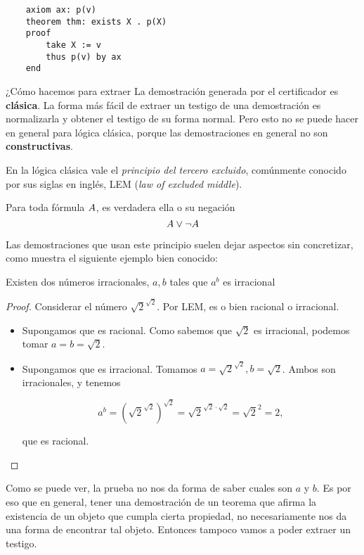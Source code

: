 \begin{verbatim}
    axiom ax: p(v)
    theorem thm: exists X . p(X)
    proof
        take X := v
        thus p(v) by ax
    end
\end{verbatim}

¿Cómo hacemos para extraer La demostración generada por el certificador es \textbf{clásica}. La forma más
fácil de extraer un testigo de una demostración es normalizarla y obtener el
testigo de su forma normal. Pero esto no se puede hacer en general para lógica
clásica, porque las demostraciones en general no son \textbf{constructivas}.

En la lógica clásica vale el \textit{principio del tercero excluido}, comúnmente
conocido por sus siglas en inglés, LEM (\textit{law of excluded middle}).

\begin{prop}[LEM] Para toda fórmula $A$, es verdadera ella o su negación
    \[ A \vee \neg A \]
\end{prop}

Las demostraciones que usan este principio suelen dejar aspectos sin
concretizar, como muestra el siguiente ejemplo bien conocido:

\begin{theorem}\label{thm:irrat}
    Existen dos números irracionales, $a, b$ tales que $a^b$ es irracional
\end{theorem}
\begin{proof}
    Considerar el número $\sqrt{2}^{\sqrt{2}}$. Por LEM, es o bien racional o
    irracional.
    \begin{itemize}
        \item Supongamos que es racional. Como sabemos que $\sqrt{2}$ es
        irracional, podemos tomar $a=b=\sqrt{2}$.
        \item Supongamos que es irracional. Tomamos $a = \sqrt{2}^{\sqrt{2}}, b
        = \sqrt{2}$. Ambos son irracionales, y tenemos

        \[
            a^b
            = \left( \sqrt{2}^{\sqrt{2}} \right)^{\sqrt{2}}
            = \sqrt{2}^{\sqrt{2} \cdot \sqrt{2}}
            = \sqrt{2}^{2}
            = 2,
        \]

        que es racional.
    \end{itemize}
\end{proof}

Como se puede ver, la prueba no nos da forma de saber cuales son $a$ y $b$. Es
por eso que en general, tener una demostración de un teorema que afirma la
existencia de un objeto que cumpla cierta propiedad, no necesariamente nos da
una forma de encontrar tal objeto. Entonces tampoco vamos a poder extraer un
testigo.

